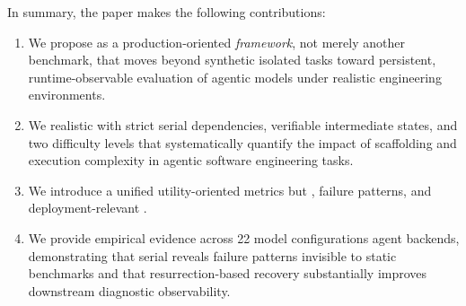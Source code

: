 In summary, the paper makes the following contributions:
\begin{enumerate}[nosep]
\item We propose \eva{} as a production-oriented  \emph{framework}, not merely another benchmark, that moves beyond synthetic isolated tasks toward persistent, runtime-observable evaluation of agentic models under realistic engineering environments.
\item We  realistic  with strict serial dependencies, verifiable intermediate states, and two difficulty levels that systematically quantify the impact of scaffolding and execution complexity in agentic software engineering tasks.
\item We introduce a unified  utility-oriented metrics but , failure patterns, and deployment-relevant .
\item We provide empirical evidence across 22 model configurations   agent backends,  demonstrating that serial  reveals failure patterns invisible to static benchmarks and that resurrection-based recovery substantially improves downstream diagnostic observability.
\end{enumerate}